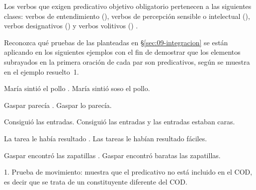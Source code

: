 \begin{recuadro}
Los verbos que exigen predicativo objetivo obligatorio pertenecen a las
siguientes clases: verbos de entendimiento (), verbos de percepción sensible o intelectual (), verbos designativos () y verbos volitivos ()
\parencite[134]{ditullio2014}.
\end{recuadro}

\begin{ejercicio}\label{ej:09-pruebas}
Reconozca qué pruebas de las planteadas en §\ref{sec:09-integracion} se están
aplicando en los siguientes ejemplos con el fin de demostrar que los elementos
subrayados en la primera oración de cada par son predicativos, según se muestra
en el ejemplo resuelto~1.

\begin{exe}
  \ex
    \begin{xlist}
      \ex María sintió el pollo .
      \ex María sintió soso el pollo.
    \end{xlist}
  \ex
    \begin{xlist}
      \ex Gaspar parecía .
      \ex Gaspar lo parecía.
    \end{xlist}
  \ex
    \begin{xlist}
      \ex Consiguió  las entradas.
      \ex Consiguió las entradas y las entradas estaban caras.
    \end{xlist}
  \ex
    \begin{xlist}
      \ex La tarea le había resultado .
      \ex Las tareas le habían resultado fáciles.
    \end{xlist}
  \ex
    \begin{xlist}
      \ex Gaspar encontró las zapatillas .
      \ex Gaspar encontró baratas las zapatillas.
    \end{xlist}
\end{exe}

\begin{resuelto}
1. Prueba de movimiento: muestra que el predicativo no está incluido en el COD,
es decir que se trata de un constituyente diferente del COD.
\end{resuelto}
\end{ejercicio}

